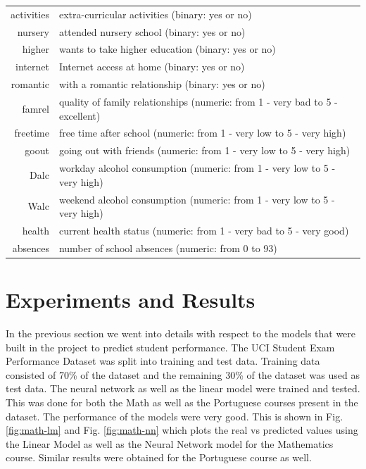 \documentclass[conference]{IEEEtran}
\begin{document}
\begin{table}[!t]
\begin{tabular}{|r || l|}
activities & extra-curricular activities (binary: yes or no)\\
nursery & attended nursery school (binary: yes or no)\\
higher & wants to take higher education (binary: yes or no)\\
internet & Internet access at home (binary: yes or no)\\
romantic & with a romantic relationship (binary: yes or no)\\
famrel & quality of family relationships (numeric: from 1 - very bad to 5 - excellent)\\
freetime & free time after school (numeric: from 1 - very low to 5 - very high)\\
goout & going out with friends (numeric: from 1 - very low to 5 - very high)\\
Dalc & workday alcohol consumption (numeric: from 1 - very low to 5 - very high)\\
Walc & weekend alcohol consumption (numeric: from 1 - very low to 5 - very high)\\
health & current health status (numeric: from 1 - very bad to 5 - very good)\\
absences & number of school absences (numeric: from 0 to 93)\\
\hline
\end{tabular}
\end{table}
	\section{Experiments and Results} \label{expts-reslts}

In the previous section we went into details with respect to the models that were built in the project to predict student performance. The UCI Student Exam Performance Dataset was split into training and test data. Training data consisted of 70\% of the dataset and the remaining 30\% of the dataset was used as test data. The neural network as well as the linear model were trained and tested. This was done for both the Math as well as the Portuguese courses present in the dataset. The performance of the models were very good. This is shown in Fig. \ref{fig:math-lm} and Fig. \ref{fig:math-nn} which plots the real vs predicted values using the Linear Model as well as the Neural Network model for the Mathematics course. Similar results were obtained for the Portuguese course as well.
\end{document}
